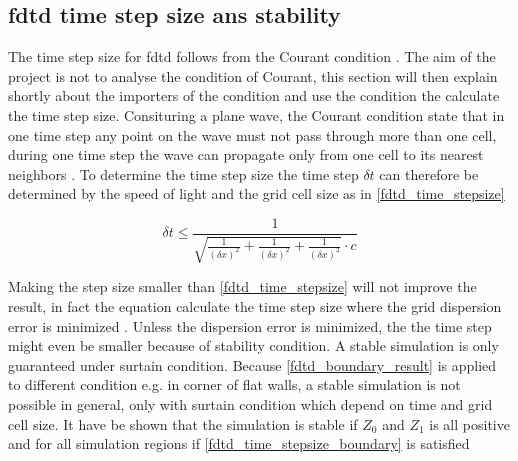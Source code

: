          \startexplain
    \stopexplain

\subsection{\gls{fdtd} time step size ans stability}    
The time step size for \gls{fdtd} follows from the Courant condition \citep{Kunz1993}. The aim of the project is not to analyse the condition of Courant, this section will then explain shortly about the importers of the condition and use the condition the calculate the time step size. Consituring a plane wave, the Courant condition state that in one time step any point on the wave must not pass through more than one cell, during one time step the wave can propagate only from one cell to its nearest neighbors \citep{Kunz1993}. To determine the time step size the time step $\delta t $ can therefore be determined by the speed of light and the grid cell size as in \autoref{fdtd_time_stepsize}



\begin{equation}\label{fdtd_time_stepsize}
\delta t \leq \frac{1}{\sqrt{\frac{1}{(\delta x)^2}+\frac{1}{(\delta x)^2}+\frac{1}{(\delta x)^2} }\cdot c}
\end{equation}
        \startexplain
    \stopexplain
    
Making the step size smaller than \autoref{fdtd_time_stepsize} will not improve the result, in fact the equation calculate the time step size where the grid dispersion error is minimized \citep{Kunz1993}. Unless the dispersion error is minimized, the the time step might even be  smaller because of stability condition. 
A stable simulation is only guaranteed under surtain condition. Because \autoref{fdtd_boundary_result} is applied to different condition e.g. in corner of flat walls, a stable simulation is not possible in general, only with surtain condition which depend on time and grid cell size. It have be shown that the simulation is stable if $Z_0$ and $Z_{1}$ is all positive and for all simulation regions if \autoref{fdtd_time_stepsize_boundary} is satisfied

